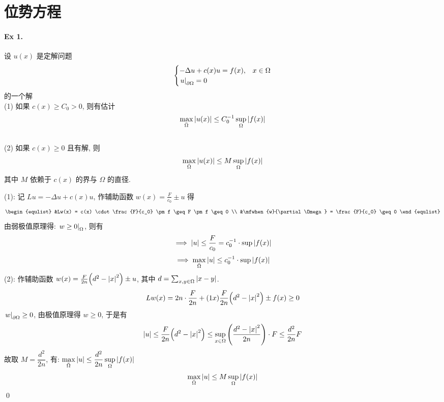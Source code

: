 \section{位势方程}
\paragraph{Ex 1.}
设 $u(x)$ 是定解问题
\[ \begin{cases}
-\Delta u + c(x) u = f(x), & x \in \Omega \\
{\left.{u} \right|}_{\partial \Omega} = 0
\end{cases} \]
的一个解 \\
(1) 如果 $c(x) \geq C_0 > 0$, 则有估计
\[ \max_{\bar\Omega}{\lvert {u(x)} \rvert} \leq C_0^{-1} \sup_{\Omega}{\lvert {f(x)} \rvert} \]\\
(2) 如果 $c(x) \geq 0$ 且有解, 则
\[ \max_{\bar\Omega}{\lvert {u(x)} \rvert} \leq M \sup_{\Omega}{\lvert {f(x)} \rvert} \]
其中 $M$ 依赖于 $c(x)$ 的界与 $\Omega$ 的直径.

\begin{solution}
\noindent (1): 记 $Lu = -\Delta u+c(x)u$, 作辅助函数 $w(x)=\frac F{c_0}\pm u$ 得
\[ \begin{equlist}
&Lw(x) = c(x) \cdot \frac{F}{c_0} \pm f \geq F \pm f \geq 0 \\
&\mfwhen{w}{\partial\Omega} = \frac{F}{c_0} \geq 0
\end{equlist} \]
由弱极值原理得: ${\left.{w\geq0} \right|}_{\Omega}$, 则有
\[\implies {\lvert {u} \rvert} \leq \frac{F}{c_0} = c_0^{-1} \cdot \sup{\lvert {f(x)} \rvert}\]
\[\implies \max_{\bar\Omega}{\lvert {u} \rvert}\leq c_0^{-1} \cdot \sup{\lvert {f(x)} \rvert}\]
\noindent (2): 作辅助函数 $w(x)=\frac F{2n}{\left( {d^2-{\lvert {x} \rvert}^2} \right)}\pm u$, 其中
$d = \sum_{x, y\in\Omega}{\lvert {x-y} \rvert}$.
\[
Lw(x) = 2n \cdot \frac{F}{2n} + (1x)\frac{F}{2n}{\left( {d^2-{\lvert {x} \rvert}^2} \right)} \pm
f(x) \geq 0
\]
${\left.{w} \right|}_{\partial\Omega}\geq0$, 由极值原理得 $w\geq0$, 于是有
\[{\lvert {u} \rvert}\leq\frac F{2n}{\left( {d^2-{\lvert {x} \rvert}^2} \right)}\leq\sup_{x\in\Omega}
{\left( {\frac{d^2-{\lvert {x} \rvert}^2}{2n}} \right)}\cdot F\leq\frac{d^2}{2n}F\]
故取 $M = \dfrac{d^2}{2n}$, 有:
$\max\limits_{\bar\Omega}{\lvert {u} \rvert}\leq\dfrac{d^2}{2n}\sup\limits_\Omega{\lvert {f(x)} \rvert}$
\[\max_{\bar\Omega}{\lvert {u} \rvert}\leq M\sup_\Omega{\lvert {f(x)} \rvert}\]
\qed
\end{solution}


